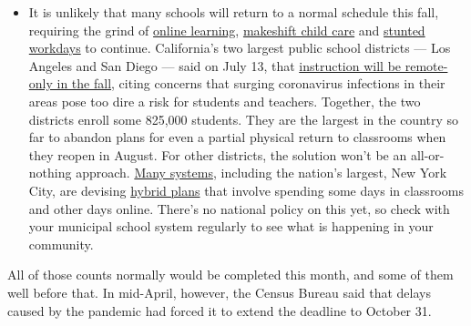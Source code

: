 \begin{itemize}
  \begin{itemize}
  \tightlist
  \item
    It is unlikely that many schools will return to a normal schedule
    this fall, requiring the grind of
    \href{https://www.nytimes.com/2020/06/05/us/coronavirus-education-lost-learning.html?action=click\&pgtype=Article\&state=default\&region=MAIN_CONTENT_3\&context=storylines_faq}{online
    learning},
    \href{https://www.nytimes.com/2020/05/29/us/coronavirus-child-care-centers.html?action=click\&pgtype=Article\&state=default\&region=MAIN_CONTENT_3\&context=storylines_faq}{makeshift
    child care} and
    \href{https://www.nytimes.com/2020/06/03/business/economy/coronavirus-working-women.html?action=click\&pgtype=Article\&state=default\&region=MAIN_CONTENT_3\&context=storylines_faq}{stunted
    workdays} to continue. California's two largest public school
    districts --- Los Angeles and San Diego --- said on July 13, that
    \href{https://www.nytimes.com/2020/07/13/us/lausd-san-diego-school-reopening.html?action=click\&pgtype=Article\&state=default\&region=MAIN_CONTENT_3\&context=storylines_faq}{instruction
    will be remote-only in the fall}, citing concerns that surging
    coronavirus infections in their areas pose too dire a risk for
    students and teachers. Together, the two districts enroll some
    825,000 students. They are the largest in the country so far to
    abandon plans for even a partial physical return to classrooms when
    they reopen in August. For other districts, the solution won't be an
    all-or-nothing approach.
    \href{https://bioethics.jhu.edu/research-and-outreach/projects/eschool-initiative/school-policy-tracker/}{Many
    systems}, including the nation's largest, New York City, are
    devising
    \href{https://www.nytimes.com/2020/06/26/us/coronavirus-schools-reopen-fall.html?action=click\&pgtype=Article\&state=default\&region=MAIN_CONTENT_3\&context=storylines_faq}{hybrid
    plans} that involve spending some days in classrooms and other days
    online. There's no national policy on this yet, so check with your
    municipal school system regularly to see what is happening in your
    community.
  \end{itemize}
\end{itemize}

All of those counts normally would be completed this month, and some of
them well before that. In mid-April, however, the Census Bureau said
that delays caused by the pandemic had forced it to extend the deadline
to October 31.


